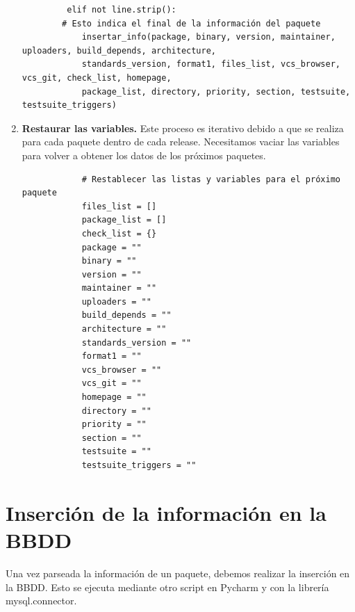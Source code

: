 \documentclass[a4paper, 12pt]{book}
\begin{document}
\begin{enumerate}
	\begin{verbatim}
		 elif not line.strip():
		# Esto indica el final de la información del paquete
			insertar_info(package, binary, version, maintainer, uploaders, build_depends, architecture,
			standards_version, format1, files_list, vcs_browser, vcs_git, check_list, homepage,
			package_list, directory, priority, section, testsuite, testsuite_triggers)
	\end{verbatim}
	
		\item \textbf{Restaurar las variables.} Este proceso es iterativo debido a que se realiza para cada paquete dentro de cada release. Necesitamos vaciar las variables para volver a obtener los datos de los próximos paquetes.
		
		\begin{verbatim}
        	# Restablecer las listas y variables para el próximo paquete
			files_list = []
			package_list = []
			check_list = {}
			package = ""
			binary = ""
			version = ""
			maintainer = ""
			uploaders = ""
			build_depends = ""
			architecture = ""
			standards_version = ""
			format1 = ""
			vcs_browser = ""
			vcs_git = ""
			homepage = ""
			directory = ""
			priority = ""
			section = ""
			testsuite = ""
			testsuite_triggers = ""
		\end{verbatim}
		
\end{enumerate}

\section{Inserción de la información en la BBDD}
\label{sec:insercion_BBDD}
Una vez parseada la información de un paquete, debemos realizar la inserción en la BBDD. Esto se ejecuta mediante otro script en Pycharm y con la librería mysql.connector.
\end{document}

